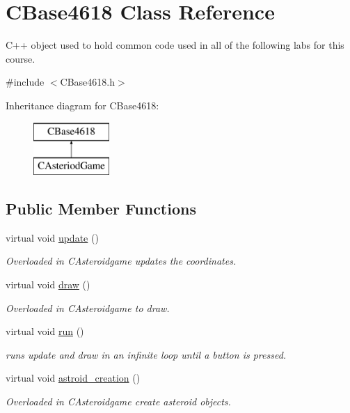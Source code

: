 \hypertarget{class_c_base4618}{}\section{C\+Base4618 Class Reference}
\label{class_c_base4618}


C++ object used to hold common code used in all of the following labs for this course.  




{\ttfamily \#include $<$C\+Base4618.\+h$>$}

Inheritance diagram for C\+Base4618\+:\begin{figure}[H]
\begin{center}
\leavevmode
\includegraphics[height=2.000000cm]{class_c_base4618}
\end{center}
\end{figure}
\subsection*{Public Member Functions}
\begin{DoxyCompactItemize}
\item 
virtual void \hyperlink{class_c_base4618_ae1ac81eaa56ded6600262c361f723cb8}{update} ()
\begin{DoxyCompactList}\small\item\em Overloaded in C\+Asteroidgame updates the coordinates. \end{DoxyCompactList}\item 
virtual void \hyperlink{class_c_base4618_a853327d563d064bb31db241861c4d291}{draw} ()
\begin{DoxyCompactList}\small\item\em Overloaded in C\+Asteroidgame to draw. \end{DoxyCompactList}\item 
virtual void \hyperlink{class_c_base4618_a535e816d735d10d6048dd39cd893d393}{run} ()
\begin{DoxyCompactList}\small\item\em runs update and draw in an infinite loop until a button is pressed. \end{DoxyCompactList}\item 
virtual void \hyperlink{class_c_base4618_a30aae55b21db35e1d70b04659a0feeb9}{astroid\+\_\+creation} ()
\begin{DoxyCompactList}\small\item\em Overloaded in C\+Asteroidgame create asteroid objects. \end{DoxyCompactList}\end{DoxyCompactItemize}
